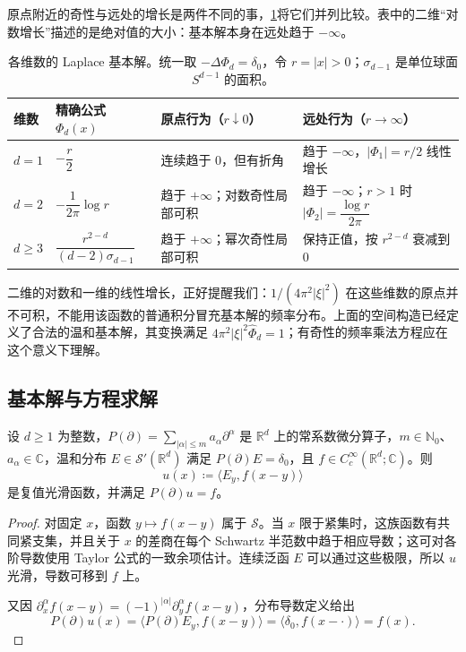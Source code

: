 原点附近的奇性与远处的增长是两件不同的事，\cref{b2:tab:05-laplace-fundamental-dimensions}将它们并列比较。表中的二维“对数增长”描述的是绝对值的大小：基本解本身在远处趋于 \(-\infty\)。

\begin{table}[htbp]
 \centering
 \small
 \setlength{\tabcolsep}{4pt}
 \caption[各维数的 Laplace 基本解]{各维数的 Laplace 基本解。统一取 \(-\Delta\Phi_d=\delta_0\)，令 \(r=|x|>0\)；\(\sigma_{d-1}\) 是单位球面 \(S^{d-1}\) 的面积。}
 \label{b2:tab:05-laplace-fundamental-dimensions}
 \begin{tabularx}{\linewidth}{@{}>{\raggedright\arraybackslash}p{1.0cm}>{\raggedright\arraybackslash}p{4.1cm}>{\raggedright\arraybackslash}p{3.7cm}>{\raggedright\arraybackslash}X@{}}
  \toprule
  维数 & 精确公式 \(\Phi_d(x)\) & 原点行为（\(r\downarrow0\)） & 远处行为（\(r\to\infty\)） \\
  \midrule
  \(d=1\) & \(-\dfrac r2\) & 连续趋于 \(0\)，但有折角 & 趋于 \(-\infty\)，\(|\Phi_1|=r/2\) 线性增长 \\
  \(d=2\) & \(-\dfrac1{2\pi}\log r\) & 趋于 \(+\infty\)；对数奇性局部可积 & 趋于 \(-\infty\)；\(r>1\) 时 \(|\Phi_2|=\dfrac{\log r}{2\pi}\) \\
  \(d\geq3\) & \(\dfrac{r^{2-d}}{(d-2)\sigma_{d-1}}\) & 趋于 \(+\infty\)；幂次奇性局部可积 & 保持正值，按 \(r^{2-d}\) 衰减到 \(0\) \\
  \bottomrule
 \end{tabularx}
\end{table}

二维的对数和一维的线性增长，正好提醒我们：\(1/(4\pi^2|\xi|^2)\) 在这些维数的原点并不可积，不能用该函数的普通积分冒充基本解的频率分布。上面的空间构造已经定义了合法的温和基本解，其变换满足 \(4\pi^2|\xi|^2\widehat\Phi_d=1\)；有奇性的频率乘法方程应在这个意义下理解。

\subsection{基本解与方程求解}
\label{b2:subsec:050404}

\begin{proposition}\label{b2:prop:05-fundamental-convolution}
设 \(d\geq1\) 为整数，\(P(\partial)=\sum_{|\alpha|\le m}a_\alpha\partial^\alpha\) 是 \(\mathbb R^d\) 上的常系数微分算子，\(m\in\mathbb N_0\)、\(a_\alpha\in\mathbb C\)，温和分布 \(E\in\mathcal S'(\mathbb R^d)\) 满足 \(P(\partial)E=\delta_0\)，且 \(f\in C_c^\infty(\mathbb R^d;\mathbb C)\)。则
\[
 u(x)\coloneqq\langle E_y,f(x-y)\rangle
\]
是复值光滑函数，并满足 \(P(\partial)u=f\)。
\end{proposition}
\begin{proof}
对固定 \(x\)，函数 \(y\mapsto f(x-y)\) 属于 \(\mathcal S\)。当 \(x\) 限于紧集时，这族函数有共同紧支集，并且关于 \(x\) 的差商在每个 Schwartz 半范数中趋于相应导数；这可对各阶导数使用 Taylor 公式的一致余项估计。连续泛函 \(E\) 可以通过这些极限，所以 \(u\) 光滑，导数可移到 \(f\) 上。

又因 \(\partial_x^\alpha f(x-y)=(-1)^{|\alpha|}\partial_y^\alpha f(x-y)\)，分布导数定义给出
\[
 P(\partial)u(x)=\langle P(\partial)E_y,f(x-y)\rangle
 =\langle\delta_0,f(x-\cdot)\rangle=f(x).
\]
\end{proof}

